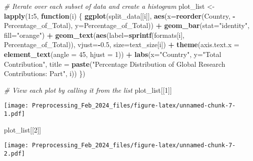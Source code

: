 \documentclass[
]{article}
\newenvironment{Shaded}{\begin{snugshade}}{\end{snugshade}}
\newcommand{\AttributeTok}[1]{\textcolor[rgb]{0.13,0.29,0.53}{#1}}
\newcommand{\CommentTok}[1]{\textcolor[rgb]{0.56,0.35,0.01}{\textit{#1}}}
\newcommand{\ControlFlowTok}[1]{\textcolor[rgb]{0.13,0.29,0.53}{\textbf{#1}}}
\newcommand{\DecValTok}[1]{\textcolor[rgb]{0.00,0.00,0.81}{#1}}
\newcommand{\FloatTok}[1]{\textcolor[rgb]{0.00,0.00,0.81}{#1}}
\newcommand{\FunctionTok}[1]{\textcolor[rgb]{0.13,0.29,0.53}{\textbf{#1}}}
\newcommand{\NormalTok}[1]{#1}
\newcommand{\OtherTok}[1]{\textcolor[rgb]{0.56,0.35,0.01}{#1}}
\newcommand{\SpecialCharTok}[1]{\textcolor[rgb]{0.81,0.36,0.00}{\textbf{#1}}}
\newcommand{\StringTok}[1]{\textcolor[rgb]{0.31,0.60,0.02}{#1}}
\begin{document}
\begin{Shaded}
\begin{Highlighting}[]
\CommentTok{\# Iterate over each subset of data and create a histogram}
\NormalTok{plot\_list }\OtherTok{\textless{}{-}} \FunctionTok{lapply}\NormalTok{(}\DecValTok{1}\SpecialCharTok{:}\DecValTok{5}\NormalTok{, }\ControlFlowTok{function}\NormalTok{(i) \{}
  \FunctionTok{ggplot}\NormalTok{(split\_data[[i]], }\FunctionTok{aes}\NormalTok{(}\AttributeTok{x=}\FunctionTok{reorder}\NormalTok{(Country, }\SpecialCharTok{{-}}\NormalTok{Percentage\_of\_Total), }\AttributeTok{y=}\NormalTok{Percentage\_of\_Total)) }\SpecialCharTok{+}
    \FunctionTok{geom\_bar}\NormalTok{(}\AttributeTok{stat=}\StringTok{"identity"}\NormalTok{, }\AttributeTok{fill=}\StringTok{"orange"}\NormalTok{) }\SpecialCharTok{+}
    \FunctionTok{geom\_text}\NormalTok{(}\FunctionTok{aes}\NormalTok{(}\AttributeTok{label=}\FunctionTok{sprintf}\NormalTok{(formats[i], Percentage\_of\_Total)), }\AttributeTok{vjust=}\SpecialCharTok{{-}}\FloatTok{0.5}\NormalTok{, }\AttributeTok{size=}\NormalTok{text\_size[i]) }\SpecialCharTok{+}
    \FunctionTok{theme}\NormalTok{(}\AttributeTok{axis.text.x =} \FunctionTok{element\_text}\NormalTok{(}\AttributeTok{angle =} \DecValTok{45}\NormalTok{, }\AttributeTok{hjust =} \DecValTok{1}\NormalTok{)) }\SpecialCharTok{+}
    \FunctionTok{labs}\NormalTok{(}\AttributeTok{x=}\StringTok{"Country"}\NormalTok{, }\AttributeTok{y=}\StringTok{"Total Contribution"}\NormalTok{, }
         \AttributeTok{title =} \FunctionTok{paste}\NormalTok{(}\StringTok{"Percentage Distribution of Global Research Contributions: Part"}\NormalTok{, i))}
\NormalTok{\})}
\end{Highlighting}
\end{Shaded}

\begin{Shaded}
\begin{Highlighting}[]
\CommentTok{\# View each plot by calling it from the list}
\NormalTok{plot\_list[[}\DecValTok{1}\NormalTok{]]}
\end{Highlighting}
\end{Shaded}

\texttt{[image: Preprocessing\_Feb\_2024\_files/figure-latex/unnamed-chunk-7-1.pdf]}

\begin{Shaded}
\begin{Highlighting}[]
\NormalTok{plot\_list[[}\DecValTok{2}\NormalTok{]]}
\end{Highlighting}
\end{Shaded}

\texttt{[image: Preprocessing\_Feb\_2024\_files/figure-latex/unnamed-chunk-7-2.pdf]}
\end{document}
